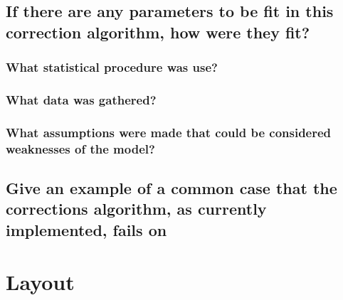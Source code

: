 \documentclass[]{article}
\begin{document}
\subsection{If there are any parameters to be fit in this correction algorithm, how were they fit?}
\subsubsection{What statistical procedure was use?}
\subsubsection{What data was gathered?}
\subsubsection{What assumptions were made that could be considered weaknesses of the model?}
\subsection{Give an example of a common case that the corrections algorithm, as currently implemented, fails on}

\section{Layout}

\end{document}
